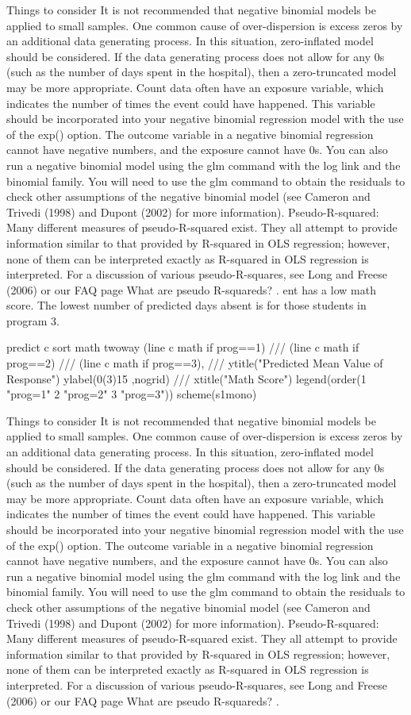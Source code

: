 Things to consider
It is not recommended that negative binomial models be applied to small samples. 
One common cause of over-dispersion is excess zeros by an additional data generating process.  In this situation, zero-inflated model should be considered.
If the data generating process does not allow for any 0s (such as the number of days spent in the hospital), then a zero-truncated model may be more appropriate.
Count data often have an exposure variable, which indicates the number of times the event could have happened.  This variable should be incorporated into your negative binomial regression model with the use of the exp() option.
The outcome variable in a negative binomial regression cannot have negative numbers, and the exposure cannot have 0s.
You can also run a negative binomial model using the glm command with the log link and the binomial family.
You will need to use the glm command to obtain the residuals to check other assumptions of the negative binomial model (see Cameron and Trivedi (1998) and Dupont (2002) for more information).
Pseudo-R-squared:  Many different measures of pseudo-R-squared exist. They all attempt to provide information similar to that provided by R-squared in OLS regression; however, none of them can be interpreted exactly as R-squared in OLS regression is interpreted. For a discussion of various pseudo-R-squares, see Long and Freese (2006) or our FAQ page What are pseudo R-squareds? .
ent has a low math score.  The lowest number of predicted days absent is for those students in program 3.

predict c
sort math
twoway (line c math if prog==1) ///
(line c math if prog==2) ///
(line c math if prog==3), ///
ytitle("Predicted Mean Value of Response") ylabel(0(3)15 ,nogrid) ///
xtitle("Math Score") legend(order(1 "prog=1" 2 "prog=2" 3 "prog=3")) scheme(s1mono)



Things to consider
It is not recommended that negative binomial models be applied to small samples. 
One common cause of over-dispersion is excess zeros by an additional data generating process.  In this situation, zero-inflated model should be considered.
If the data generating process does not allow for any 0s (such as the number of days spent in the hospital), then a zero-truncated model may be more appropriate.
Count data often have an exposure variable, which indicates the number of times the event could have happened.  This variable should be incorporated into your negative binomial regression model with the use of the exp() option.
The outcome variable in a negative binomial regression cannot have negative numbers, and the exposure cannot have 0s.
You can also run a negative binomial model using the glm command with the log link and the binomial family.
You will need to use the glm command to obtain the residuals to check other assumptions of the negative binomial model (see Cameron and Trivedi (1998) and Dupont (2002) for more information).
Pseudo-R-squared:  Many different measures of pseudo-R-squared exist. They all attempt to provide information similar to that provided by R-squared in OLS regression; however, none of them can be interpreted exactly as R-squared in OLS regression is interpreted. For a discussion of various pseudo-R-squares, see Long and Freese (2006) or our FAQ page What are pseudo R-squareds? .
